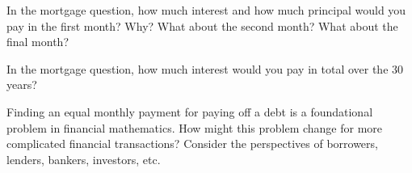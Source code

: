 \documentclass{ximera}
\begin{document}
\break

\begin{question}
In the mortgage question, how much interest and how much principal
would you pay in the first month? Why? What about the second month? What about the final month?
\begin{freeResponse}
\end{freeResponse}
\end{question}

\begin{question}
In the mortgage question, how much interest would you pay in total
over the $30$ years?
\begin{freeResponse}
\end{freeResponse}
\end{question}

\begin{question}
Finding an equal monthly payment for paying off a debt is a foundational problem in financial mathematics.  
How might this problem change for more complicated financial transactions?  Consider the perspectives of 
borrowers, lenders, bankers, investors, etc.  
\begin{freeResponse}
\end{freeResponse}
\end{question}
\end{document}

